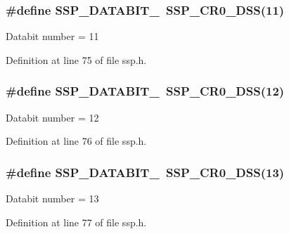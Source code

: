 \subsubsection[{\texorpdfstring{S\+S\+P\+\_\+\+D\+A\+T\+A\+B\+I\+T\+\_\+11}{SSP_DATABIT_11}}]{\setlength{\rightskip}{0pt plus 5cm}\#define S\+S\+P\+\_\+\+D\+A\+T\+A\+B\+I\+T\+\_~{\bf S\+S\+P\+\_\+\+C\+R0\+\_\+\+D\+SS}(11)}\hypertarget{group___s_s_p___public___macros_ga4c54d482586fe521fc51fe2f660d92db}{}\label{group___s_s_p___public___macros_ga4c54d482586fe521fc51fe2f660d92db}
Databit number = 11 

Definition at line 75 of file ssp.\+h.

\subsubsection[{\texorpdfstring{S\+S\+P\+\_\+\+D\+A\+T\+A\+B\+I\+T\+\_\+12}{SSP_DATABIT_12}}]{\setlength{\rightskip}{0pt plus 5cm}\#define S\+S\+P\+\_\+\+D\+A\+T\+A\+B\+I\+T\+\_~{\bf S\+S\+P\+\_\+\+C\+R0\+\_\+\+D\+SS}(12)}\hypertarget{group___s_s_p___public___macros_ga60cef3d2aa9a028b4e648abca8a20ea6}{}\label{group___s_s_p___public___macros_ga60cef3d2aa9a028b4e648abca8a20ea6}
Databit number = 12 

Definition at line 76 of file ssp.\+h.

\subsubsection[{\texorpdfstring{S\+S\+P\+\_\+\+D\+A\+T\+A\+B\+I\+T\+\_\+13}{SSP_DATABIT_13}}]{\setlength{\rightskip}{0pt plus 5cm}\#define S\+S\+P\+\_\+\+D\+A\+T\+A\+B\+I\+T\+\_~{\bf S\+S\+P\+\_\+\+C\+R0\+\_\+\+D\+SS}(13)}\hypertarget{group___s_s_p___public___macros_ga6e7696139bcc6ffbea4c7633db5691bc}{}\label{group___s_s_p___public___macros_ga6e7696139bcc6ffbea4c7633db5691bc}
Databit number = 13 

Definition at line 77 of file ssp.\+h.

